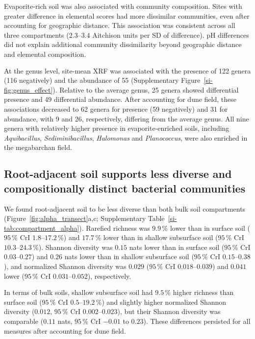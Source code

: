 \documentclass[fleqn,10pt,numbers]{olplainarticle}
\begin{document}
Evaporite-rich soil was also associated with community composition. Sites with greater difference in elemental scores had more dissimilar communities, even after accounting for geographic distance. This association was consistent across all three compartments ($2.3$--$3.4$ Aitchison units per SD of difference). pH differences did not explain additional community dissimilarity beyond geographic distance and elemental composition.

At the genus level, site-mean XRF was associated with the presence of 122 genera (116 negatively) and the abundance of 55 (Supplementary Figure~\ref{si-fig:genus_effect}). Relative to the average genus, 25 genera showed differential presence and 49 differential abundance. After accounting for dune field, these associations decreased to 62 genera for presence (59 negatively) and 31 for abundance, with 9 and 26, respectively, differing from the average genus. All nine genera with relatively higher presence in evaporite-enriched soils, including \textit{Aquibacillus}, \textit{Sediminibacillus}, \textit{Halomonas} and \textit{Planococcus}, were also enriched in the megabarchan field.


\subsection*{Root-adjacent soil supports less diverse and compositionally distinct bacterial communities}

We found root-adjacent soil to be less diverse than both bulk soil compartments (Figure~\ref{fig:alpha_transect}a,c; Supplementary Table~\ref{si-tab:compartment_alpha}). Rarefied richness was $9.9\,\%$ lower than in surface soil ($95\,\%$ CrI $1.8$--$17.2\,\%$) and $17.7\,\%$ lower than in shallow subsurface soil ($95\,\%$ CrI $10.3$--$24.3\,\%$). Shannon diversity was $0.15$ nats lower than in surface soil ($95\,\%$ CrI $0.03$--$0.27$) and $0.26$ nats lower than in shallow subsurface soil ($95\,\%$ CrI $0.15$--$0.38$), and normalized Shannon diversity was $0.029$ ($95\,\%$ CrI $0.018$--$0.039$) and $0.041$ lower ($95\,\%$ CrI $0.031$--$0.052$), respectively.

In terms of bulk soils, shallow subsurface soil had $9.5\,\%$ higher richness than surface soil ($95\,\%$ CrI $0.5$--$19.2\,\%$) and slightly higher normalized Shannon diversity ($0.012$, $95\,\%$ CrI $0.002$--$0.023$), but their Shannon diversity was comparable ($0.11$ nats, $95\,\%$ CrI $-0.01$ to $0.23$). These differences persisted for all measures after accounting for dune field.
\end{document}
